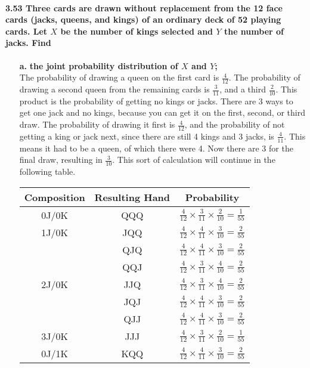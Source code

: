 \documentclass{article}
\begin{document}
\paragraph{3.53 Three cards are drawn without replacement from the 12 
face cards (jacks, queens, and kings) of an ordinary deck of 52 
playing cards. Let $X$ be the number of kings selected and $Y$ the 
number of jacks. Find}
\begin{enumerate}
\item[\textbf{a.}] \textbf{the joint probability distribution of $X$ 
and $Y$;}\\
The probability of drawing a queen on the first card is 
$\frac{4}{12}$. The probability of drawing a second queen from the
remaining cards is $\frac{3}{11}$, and a third $\frac{2}{10}$. This
product is the probability of getting no kings or jacks. There are 3
ways to get one jack and no kings, because you can get it on the 
first, second, or third draw. The probability of drawing it first is
$\frac{4}{12}$, and the probability of not getting a king or jack 
next, since there are still 4 kings and 3 jacks, is $\frac{4}{11}$.
This means it had to be a queen, of which there were 4. Now there are
3 for the final draw, resulting in $\frac{3}{10}$. This sort of
calculation will continue in the following table.
\begin{center}
\begin{tabular}{c|c|c}
Composition & Resulting Hand & Probability\\
\hline
0J/0K & QQQ & $\frac{4}{12}\times\frac{3}{11}\times\frac{2}{10}=\frac{1}{55}$\\
\hline
1J/0K & JQQ & $\frac{4}{12}\times\frac{4}{11}\times\frac{3}{10}=\frac{2}{55}$\\
	& QJQ & $\frac{4}{12}\times\frac{4}{11}\times\frac{3}{10}=\frac{2}{55}$\\
	& QQJ & $\frac{4}{12}\times\frac{3}{11}\times\frac{4}{10}=\frac{2}{55}$\\
\hline
2J/0K & JJQ & $\frac{4}{12}\times\frac{3}{11}\times\frac{4}{10}=\frac{2}{55}$\\
	& JQJ & $\frac{4}{12}\times\frac{4}{11}\times\frac{3}{10}=\frac{2}{55}$\\
	& QJJ & $\frac{4}{12}\times\frac{4}{11}\times\frac{3}{10}=\frac{2}{55}$\\
\hline
3J/0K & JJJ & $\frac{4}{12}\times\frac{3}{11}\times\frac{2}{10}=\frac{1}{55}$\\
\hline
0J/1K & KQQ & $\frac{4}{12}\times\frac{4}{11}\times\frac{3}{10}=\frac{2}{55}$\\

\end{tabular}
\end{center}
\end{enumerate}
\end{document}
